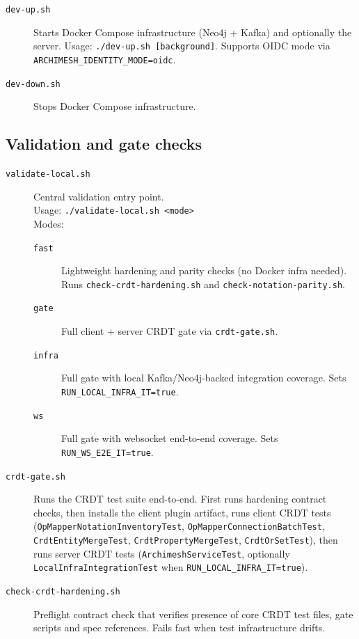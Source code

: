 \begin{description}
\item[\texttt{dev-up.sh}]
  Starts Docker Compose infrastructure (Neo4j + Kafka) and optionally the
  server. Usage: \texttt{./dev-up.sh [background]}.
  Supports OIDC mode via \texttt{ARCHIMESH\_IDENTITY\_MODE=oidc}.

\item[\texttt{dev-down.sh}]
  Stops Docker Compose infrastructure.
\end{description}

\subsection{Validation and gate checks}

\begin{description}
\item[\texttt{validate-local.sh}]
  Central validation entry point.\\
  Usage: \texttt{./validate-local.sh <mode>}\\
  Modes:
  \begin{description}
  \item[\texttt{fast}] Lightweight hardening and parity checks (no Docker
    infra needed). Runs \texttt{check-crdt-hardening.sh} and
    \texttt{check-notation-parity.sh}.
  \item[\texttt{gate}] Full client + server CRDT gate via
    \texttt{crdt-gate.sh}.
  \item[\texttt{infra}] Full gate with local Kafka/Neo4j-backed integration
    coverage. Sets \texttt{RUN\_LOCAL\_INFRA\_IT=true}.
  \item[\texttt{ws}] Full gate with websocket end-to-end coverage. Sets
    \texttt{RUN\_WS\_E2E\_IT=true}.
  \end{description}

\item[\texttt{crdt-gate.sh}]
  Runs the CRDT test suite end-to-end. First runs hardening contract checks,
  then installs the client plugin artifact, runs client CRDT tests
  (\texttt{OpMapperNotationInventoryTest}, \texttt{OpMapperConnectionBatchTest},
  \texttt{CrdtEntityMergeTest}, \texttt{CrdtPropertyMergeTest},
  \texttt{CrdtOrSetTest}), then runs server CRDT tests
  (\texttt{ArchimeshServiceTest}, optionally
  \texttt{LocalInfraIntegrationTest} when \texttt{RUN\_LOCAL\_INFRA\_IT=true}).

\item[\texttt{check-crdt-hardening.sh}]
  Preflight contract check that verifies presence of core CRDT test files,
  gate scripts and spec references. Fails fast when test infrastructure
  drifts.


\end{description}
